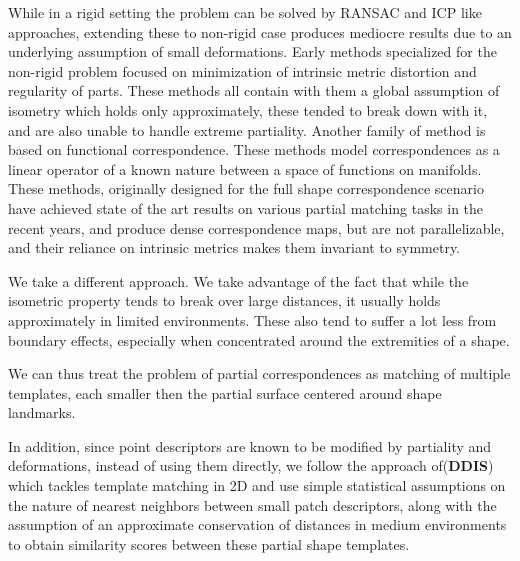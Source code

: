 \documentclass[10pt,twocolumn,letterpaper]{article}
\begin{document}
While in a rigid setting the problem can be solved by RANSAC and ICP like approaches\cite{rusu2009fast, holz2015registration}, extending these to non-rigid case produces mediocre results due to an underlying assumption of small deformations. 
Early methods specialized for the non-rigid problem focused on minimization of intrinsic metric distortion\cite{bronstein2006generalized,Torsello:2012:GAD:2354409.2354702} and regularity of parts\cite{Bronstein:2009:PSO:1553357.1553368,bronstein2008not}. These methods all contain with them a global assumption of isometry which holds only approximately, these tended to break down with it, and are also unable to handle extreme partiality. 
Another family of method is based on functional correspondence. These methods model correspondences as a linear operator of a known nature between a space of functions on manifolds\cite{Ovsjanikov:2012:FMF:2185520.2185526}. These methods, originally designed for the full shape correspondence scenario have achieved state of the art results on various partial matching tasks in the recent years\cite{litany2017fully,vestner2017efficient,rodola2017partial}, and produce dense correspondence maps, but are not parallelizable, and their reliance on intrinsic metrics makes them invariant to symmetry. 

We take a different approach. We take advantage of the fact that while the isometric property tends to break over large distances, it usually holds approximately in limited environments. These also tend to suffer a lot less from boundary effects, especially when concentrated around the extremities of a shape. 

We can thus treat the problem of partial correspondences as matching of multiple templates, each smaller then the partial surface centered around shape landmarks. 

In addition, since point descriptors are known to be modified by partiality and deformations, instead of using them directly, we follow the approach of\cite{talmi2017template}(\textbf{DDIS}) which tackles template matching in 2D and use simple statistical assumptions on the nature of nearest neighbors between small patch descriptors, along with the assumption of an approximate conservation of distances in medium environments to obtain similarity scores between these partial shape templates.
\end{document}
